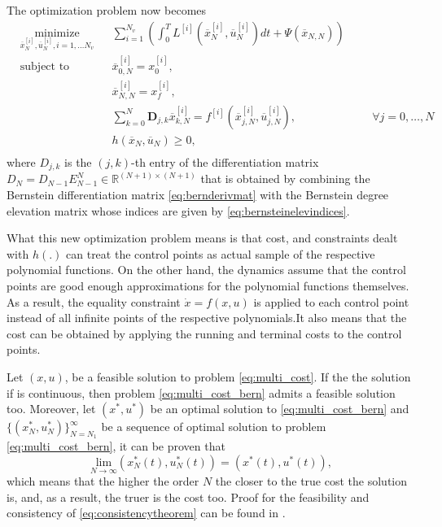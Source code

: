 \par The optimization problem now becomes 
\begin{equation}
    \label{eq:multi_cost_bern}
    \begin{aligned}
    & \underset{\overline{x}_N^{[i]},\overline{u}_N^{[i]},i= 1,\dots N_v}{\text{minimize}} && \sum_{i=1}^{N_v} \left( \int_0^T L^{[i]} (\overline{x}_N^{[i]},\overline{u}_N^{[i]})dt + \Psi (\overline{x}_{N,N}) \right) \\
    & \text{subject to}  && \overline{x}^{[i]}_{0,N} = x_0^{[i]}, \\
        & && \overline{x}^{[i]}_{N,N} = x_f^{[i]}, \\
		& && \sum_{k=0}^{N} \boldsymbol{D}_{j,k} \overline{x}_{k,N}^{[i]} = f^{[i]} (\overline{x}^{[i]}_{j,N},\overline{u}^{[i]}_{j,N}), &&& \forall j=0,\dots,N\\
        & && h(\overline{x}_N,\overline{u}_N) \geq 0, \\
    \end{aligned}
\end{equation}
where $D_{j,k}$ is the $(j,k)$-th entry of the differentiation matrix $D_N = D_{N-1}E^N_{N-1}\in \mathbb{R}^{(N+1)\times(N+1)}$ that is obtained by combining the Bernstein differentiation matrix \eqref{eq:bernderivmat} with the Bernstein degree elevation matrix whose indices are given by \eqref{eq:bernsteinelevindices}.
\par What this new optimization problem means is that cost, and constraints dealt with $h(.)$ can treat the control points as actual sample of the respective polynomial functions. On the other hand, the dynamics assume that the control points are good enough approximations for the polynomial functions themselves. As a result, the equality constraint $\dot{x}=f(x,u)$ is applied to each control point instead of all infinite points of the respective polynomials.It also means that the cost can be obtained by applying the running and terminal costs to the control points.
\par Let $(x,u)$, be a feasible solution to problem \ref{eq:multi_cost}. If the the solution if is continuous, then problem \ref{eq:multi_cost_bern} admits a feasible solution too. Moreover, let $(x^*,u^*)$ be an optimal solution to \ref{eq:multi_cost_bern} and $\{(x_N^*,u_N^*)\}^\infty_{N=N_1}$ be a sequence of optimal solution to problem \ref{eq:multi_cost_bern}, it can be proven that 
\begin{equation}
    \underset{N\rightarrow\infty}{\text{lim}} (x^*_N(t),u^*_N(t)) = (x^*(t),u^*(t)),
    \label{eq:consistencytheorem}
\end{equation}
which means that the higher the order $N$ the closer to the true cost the solution is, and, as a result, the truer is the cost too. Proof for the feasibility and consistency of \eqref{eq:consistencytheorem} can be found in \cite{cichella2018bernstein}.


